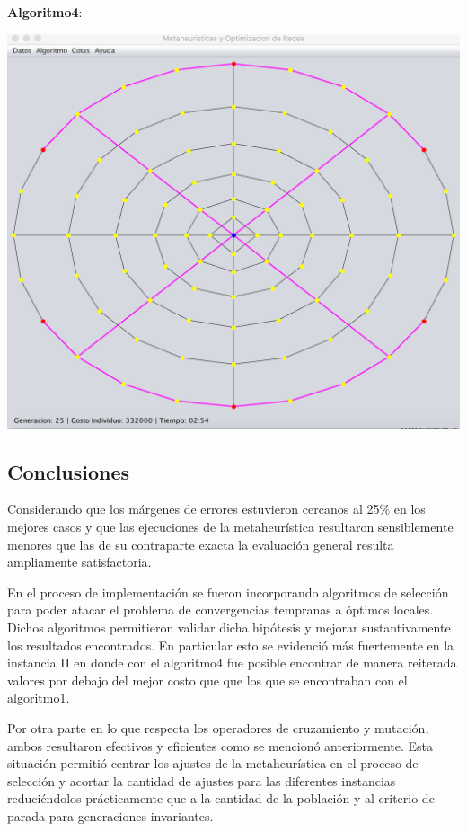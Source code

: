 \documentclass{extarticle}
\begin{document}
\textbf{Algoritmo4}:
\begin{center}
	\includegraphics[scale=0.4]{img/metaheuristica/i3_s4}
\end{center}

\subsection{Conclusiones}
Considerando que los márgenes de errores estuvieron cercanos al 25\% en los mejores casos y que las ejecuciones de la metaheurística resultaron sensiblemente menores que las de su contraparte exacta la evaluación general resulta ampliamente satisfactoria.

En el proceso de implementación se fueron incorporando algoritmos de selección para poder atacar el problema de convergencias tempranas a óptimos locales. Dichos algoritmos permitieron validar dicha hipótesis y mejorar sustantivamente los resultados encontrados. En particular esto se evidenció más fuertemente en la instancia II en donde con el algoritmo4 fue posible encontrar de manera reiterada valores por debajo del mejor costo que que los que se encontraban con el algoritmo1.

Por otra parte en lo que respecta los operadores de cruzamiento y mutación, ambos resultaron efectivos y eficientes como se mencionó anteriormente. Esta situación permitió centrar los ajustes de la metaheurística en el proceso de selección y acortar la cantidad de ajustes para las diferentes instancias reduciéndolos prácticamente que a la cantidad de la población y al criterio de parada para generaciones invariantes.
\end{document}
